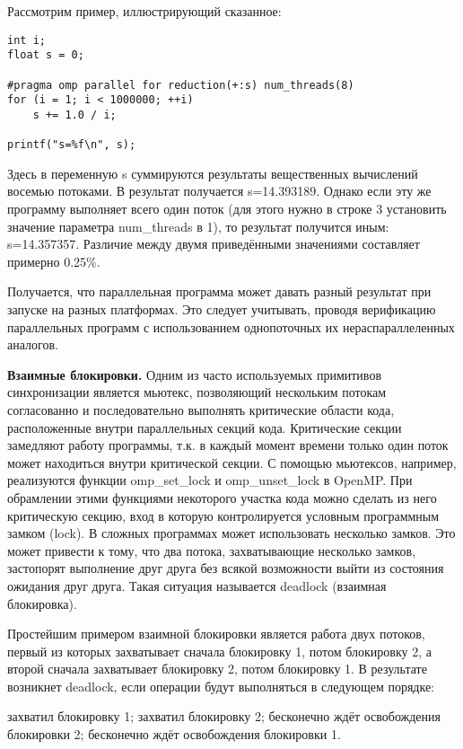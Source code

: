 Рассмотрим пример, иллюстрирующий сказанное:

\begin{verbatim}
int i;
float s = 0;

#pragma omp parallel for reduction(+:s) num_threads(8)
for (i = 1; i < 1000000; ++i)
    s += 1.0 / i;

printf("s=%f\n", s);
\end{verbatim}


Здесь в переменную s суммируются результаты вещественных вычислений восемью потоками. В результат получается s=14.393189. Однако если эту же программу выполняет всего один поток (для этого нужно в строке 3 установить значение параметра num\_threads в 1), то результат получится иным: s=14.357357. Различие между двумя приведёнными значениями составляет примерно 0.25\%. 

Получается, что параллельная программа может давать разный результат при запуске на разных платформах. Это следует учитывать, проводя верификацию параллельных программ с использованием однопоточных их нераспараллеленных аналогов.

\textbf{Взаимные блокировки.} Одним из часто используемых примитивов синхронизации является мьютекс, позволяющий нескольким потокам согласованно и последовательно выполнять критические области кода, расположенные внутри параллельных секций кода. Критические секции замедляют работу программы, т.к. в каждый момент времени только один поток может находиться внутри критической секции. С помощью мьютексов, например, реализуются функции omp\_set\_lock и omp\_unset\_lock в OpenMP. При обрамлении этими функциями некоторого участка кода можно сделать из него критическую секцию, вход в которую контролируется условным программным замком (lock). В сложных программах может использовать несколько замков. Это может привести к тому, что два потока, захватывающие несколько замков, застопорят выполнение друг друга без всякой возможности выйти из состояния ожидания друг друга. Такая ситуация называется deadlock (взаимная блокировка).

Простейшим примером взаимной блокировки является работа двух потоков, первый из которых захватывает сначала блокировку 1, потом блокировку 2, а второй сначала захватывает блокировку 2, потом блокировку 1. В результате возникнет deadlock, если операции будут выполняться в следующем порядке: 

\begin{itemize}
     захватил блокировку 1;
     захватил блокировку 2;
     бесконечно ждёт освобождения блокировки 2;
     бесконечно ждёт освобождения блокировки 1.
\end{itemize}

